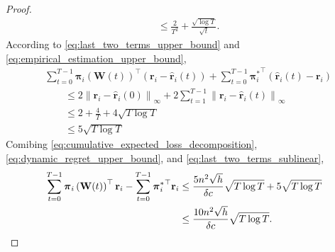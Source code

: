 \documentclass[10pt]{article}
\def\rvr{{\mathbf{r}}}
\def\rvpi{{\boldsymbol{\pi}}}
\def\rmW{{\mathbf{W}}}
\begin{document}
\begin{proof}
\begin{equation}
\begin{split}
    &\le \frac{2}{T^2} + \frac{\sqrt{\log{T}}}{\sqrt{t}}.
\end{split}
\end{equation}
According to \cref{eq:last_two_terms_upper_bound} and \cref{eq:empirical_estimation_upper_bound},
\begin{equation}
\label{eq:last_two_terms_sublinear}
\begin{split}
    &\sum\limits_{t=0}^{T-1}{ \rvpi_i\left(\rmW(t)\right)^\top \left( \rvr_i - \hat{\rvr}_i(t) \right) } + \sum\limits_{t=0}^{T-1}{ {\rvpi_i^*}^\top \left( \hat{\rvr}_i(t) - \rvr_i \right) } \\
    &\qquad \le 2 \left\| \rvr_i - \hat{\rvr}_i(0) \right\|_\infty + 2 \sum\limits_{t=1}^{T-1}{ \left\| \rvr_i - \hat{\rvr}_i(t) \right\|_\infty } \\
    &\qquad \le 2 + \frac{4}{T} + 4 \sqrt{T \log{T}} \\
    &\qquad \le 5 \sqrt{T \log{T}}
\end{split}
\end{equation}
Comibing \cref{eq:cumulative_expected_loss_decomposition}, \cref{eq:dynamic_regret_upper_bound}, and \cref{eq:last_two_terms_sublinear},
\begin{equation*}
\begin{split}
    \sum\limits_{t=0}^{T-1}{\rvpi_i\left(\rmW(t)\right)^\top \rvr_i} - \sum\limits_{t=0}^{T-1}{ {\rvpi_i^*}^\top \rvr_i } &\le \frac{5 n^2 \sqrt{h}}{\delta c}\sqrt{T \log{T}} + 5 \sqrt{T \log{T}} \\
    &\le \frac{10 n^2 \sqrt{h}}{\delta c}\sqrt{T \log{T}}. \qedhere
\end{split}
\end{equation*}
\end{proof}
\end{document}
